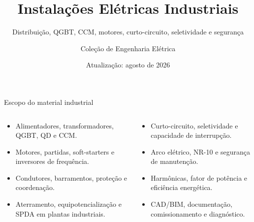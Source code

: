 \documentclass[11pt,aspectratio=169]{beamer}
\title{Instalações Elétricas Industriais}
\subtitle{Distribuição, QGBT, CCM, motores, curto-circuito, seletividade e segurança}
\author{Coleção de Engenharia Elétrica}
\institute{Material teórico — Industrial}
\date{Atualização: agosto de 2026}
\begin{document}
{\begin{frame}\titlepage\end{frame}}
\begin{frame}{Escopo do material industrial}\small
\begin{columns}[T,onlytextwidth]
\begin{caixaNorma}[title=Distribuição industrial]\begin{itemize}
\item Alimentadores, transformadores, QGBT, QD e CCM.\item Motores, partidas, soft-starters e inversores de frequência.
\item Condutores, barramentos, proteção e coordenação.\item Aterramento, equipotencialização e SPDA em plantas industriais.
\end{itemize}\end{caixaNorma}
\begin{caixaProjeto}[title=Análise e operação]\begin{itemize}
\item Curto-circuito, seletividade e capacidade de interrupção.\item Arco elétrico, NR-10 e segurança de manutenção.
\item Harmônicas, fator de potência e eficiência energética.\item CAD/BIM, documentação, comissionamento e diagnóstico.
\end{itemize}\end{caixaProjeto}\end{columns}\end{frame}













\end{document}
